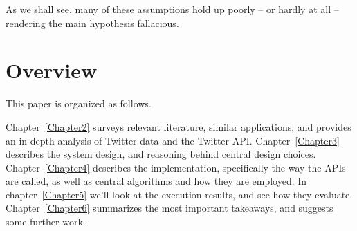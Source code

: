 As we shall see, many of these assumptions hold up poorly -- or hardly at all -- rendering the main hypothesis fallacious.


\section{Overview}

This paper is organized as follows.

Chapter~\ref{Chapter2} surveys relevant literature, similar applications, and provides an in-depth analysis of Twitter data and the Twitter API.
Chapter~\ref{Chapter3} describes the system design, and reasoning behind central design choices.
Chapter~\ref{Chapter4} describes the implementation, specifically the way the APIs are called, as well as central algorithms and how they are employed.
In chapter~\ref{Chapter5} we'll look at the execution results, and see how they evaluate.
Chapter~\ref{Chapter6} summarizes the most important takeaways, and suggests some further work.

